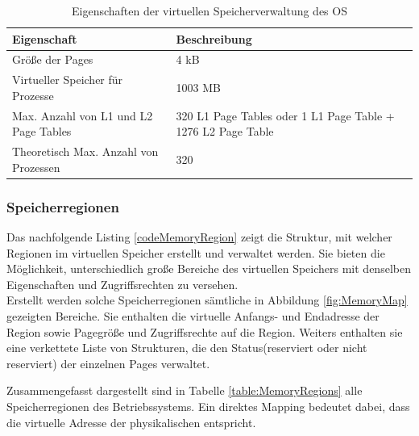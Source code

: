 \begin{table}[H]
\begin{tabular}{p{7cm} | p{7cm}}
  \textbf{Eigenschaft} & \textbf{Beschreibung} \\ \hline
  Größe der Pages & 4 kB\\
  Virtueller Speicher für Prozesse & 1003 MB\\
  Max. Anzahl von L1 und L2 Page Tables & 320 L1 Page Tables oder 1 L1 Page Table + 1276 L2 Page  Table\\
  Theoretisch Max. Anzahl von Prozessen & 320\\
 \end{tabular}
 \caption{Eigenschaften der virtuellen Speicherverwaltung des OS}
 \label{table:SpecifiedVirtualMemory}
\end{table}

\subsubsection{Speicherregionen}

Das nachfolgende Listing \ref{codeMemoryRegion} zeigt die Struktur, mit welcher Regionen im virtuellen Speicher erstellt und verwaltet werden. Sie bieten die Möglichkeit, unterschiedlich große Bereiche des virtuellen Speichers mit denselben Eigenschaften und Zugriffsrechten zu versehen.\\

Erstellt werden solche Speicherregionen sämtliche in Abbildung \ref{fig:MemoryMap} gezeigten Bereiche. Sie enthalten die virtuelle Anfangs- und Endadresse der Region sowie Pagegröße und Zugriffsrechte auf die Region. Weiters enthalten sie eine verkettete Liste von Strukturen, die den Status(reserviert oder nicht reserviert) der einzelnen Pages verwaltet.\\


\vspace{0.5cm}

Zusammengefasst dargestellt sind in Tabelle \ref{table:MemoryRegions} alle Speicherregionen des Betriebssystems. Ein direktes Mapping bedeutet dabei, dass die virtuelle Adresse der physikalischen entspricht.\\


